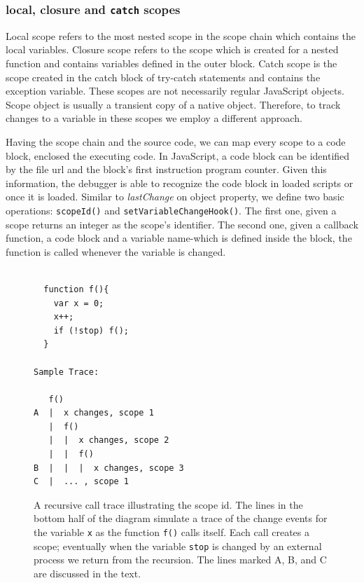 \documentclass[runningheads,a4paper]{llncs}
\begin{document}
\subsubsection{local, closure and \texttt{catch} scopes}
Local scope refers to the most nested scope in the scope
chain which contains the local variables. Closure scope refers to the 
scope which is created for a nested function and contains variables 
defined in the outer block. Catch scope is the scope created in the catch
block of try-catch statements and contains the exception
variable. These scopes are not necessarily regular JavaScript
objects. Scope object is usually a transient copy of a native object. 
Therefore, to track changes to a variable in these scopes we
employ a different approach.

Having the scope chain and the source code, we can map every scope to %
a code block, enclosed the executing code. In
JavaScript, a code block can be identified by the file url and  
the block's first instruction program counter. Given this information, the debugger is
able to recognize the code block in loaded scripts or once it is loaded.
Similar to \textit{lastChange} on object property, we define two basic operations: 
\texttt{scopeId()} and \texttt{setVariableChangeHook()}. The first one, 
given a scope returns an integer as the scope's identifier. The second one, 
given a callback function, a code block and a variable name-which is defined inside the block, the function is called
whenever the variable is changed. 

\begin{figure}[htp]
\begin{verbatim}

  function f(){
    var x = 0;
    x++;
    if (!stop) f();
  }

Sample Trace:

   f()
A  |  x changes, scope 1 
   |  f()
   |  |  x changes, scope 2
   |  |  f()
B  |  |  |  x changes, scope 3 
C  |  ... , scope 1

\end{verbatim}
\caption{A recursive call trace illustrating the scope
  id. The lines in the bottom half of the diagram simulate a trace of the change events for the variable \texttt{x} as the function \texttt{f()} calls itself. Each call creates a scope; eventually when the variable \texttt{stop} is changed by an external process we return from the recursion. The lines marked A, B, and C are discussed in the text.}
\label{fig:recursive}
\end{figure}
\end{document}
